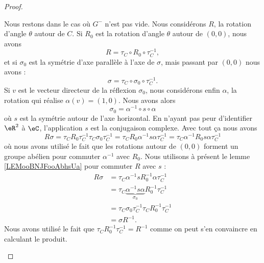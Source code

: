 \begin{proof}
\begin{subproof}
\begin{subproof}
			\spitem[\( R\sigma = \sigma R^{-1}\)]
			Nous restons dans le cas où \( G^-\) n'est pas vide. Nous considérons \( R\), la rotation d'angle \( \theta\) autour de \( C\). Si \( R_0\) est la rotation d'angle \( \theta\) autour de \( (0,0)\), nous avons
			\begin{equation}
				R=\tau_C\circ R_0\circ \tau_C^{-1},
			\end{equation}
			et si \( \sigma_0\) est la symétrie d'axe parallèle à l'axe de \( \sigma\), mais passant par \( (0,0)\) nous avons :
			\begin{equation}
				\sigma=\tau_C\circ\sigma_0\circ\tau_C^{-1}.
			\end{equation}
			Si \( v\) est le vecteur directeur de la réflexion \( \sigma_0\), nous considérons enfin \( \alpha\), la rotation qui réalise \( \alpha(v)=(1,0)\). Nous avons alors
			\begin{equation}
				\sigma_0=\alpha^{-1}\circ s\circ \alpha
			\end{equation}
			où \( s\) est la symétrie autour de l'axe horizontal. En n'ayant pas peur d'identifier \( \eR^2\) à \( \eC\), l'application \( s\) est la conjugaison complexe. Avec tout ça nous avons
			\begin{equation}
				R\sigma=\tau_CR_0\tau_C^{-1}\tau_C\sigma_0\tau_C^{-1}=\tau_CR_0\alpha^{-1}s\alpha\tau_C^{-1}=\tau_C\alpha^{-1}R_0s\alpha\tau_C^{-1}
			\end{equation}
			où nous avons utilisé le fait que les rotations autour de \( (0,0)\) forment un groupe abélien pour commuter \( \alpha^{-1}\) avec \( R_0\). Nous utilisons à présent le lemme \ref{LEMooBNJFooAbhsUa} pour commuter \( R\) avec \( s\) :
			\begin{subequations}
				\begin{align}
					R\sigma & =\tau_C\alpha^{-1}sR_0^{-1}\alpha\tau_C^{-1}                          \\
					        & =\tau_C\underbrace{\alpha^{-1}s\alpha}_{\sigma_0} R_0^{-1}\tau_C^{-1} \\
					        & =\tau_C\sigma_0\tau_C^{-1}\tau_CR_0^{-1}\tau_C^{-1}                   \\
					        & =\sigma R^{-1}.
				\end{align}
			\end{subequations}
			Nous avons utilisé le fait que \( \tau_CR_0^{-1}\tau_C^{-1}=R^{-1}\) comme on peut s'en convaincre en calculant le produit.



\end{subproof}
\end{subproof}
\end{proof}
